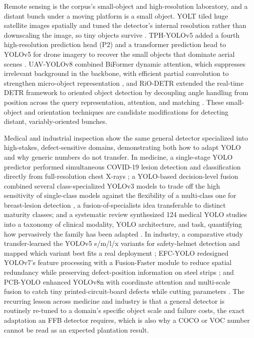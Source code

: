Remote sensing is the corpus's small-object and high-resolution laboratory, and a distant bunch under a moving platform is a small object. YOLT tiled huge satellite images spatially and tuned the detector's internal resolution rather than downscaling the image, so tiny objects survive \cite{vanetten2018yolt}. TPH-YOLOv5 added a fourth high-resolution prediction head (P2) and a transformer prediction head to YOLOv5 for drone imagery to recover the small objects that dominate aerial scenes \cite{zhu2021tphyolov5}. UAV-YOLOv8 combined BiFormer dynamic attention, which suppresses irrelevant background in the backbone, with efficient partial convolution to strengthen micro-object representation \cite{wang2023uavyolo}, and RiO-DETR extended the real-time DETR framework to oriented object detection by decoupling angle handling from position across the query representation, attention, and matching \cite{hu2026riodetr}. These small-object and orientation techniques are candidate modifications for detecting distant, variably-oriented bunches.

Medical and industrial inspection show the same general detector specialized into high-stakes, defect-sensitive domains, demonstrating both how to adapt YOLO and why generic numbers do not transfer. In medicine, a single-stage YOLO predictor performed simultaneous COVID-19 lesion detection and classification directly from full-resolution chest X-rays \cite{alantari2020covid}; a YOLO-based decision-level fusion combined several class-specialized YOLOv3 models to trade off the high sensitivity of single-class models against the flexibility of a multi-class one for breast-lesion detection \cite{baccouche2021breast}, a fusion-of-specialists idea transferable to distinct maturity classes; and a systematic review synthesized 124 medical YOLO studies into a taxonomy of clinical modality, YOLO architecture, and task, quantifying how pervasively the family has been adapted \cite{qureshi2024medyolo}. In industry, a comparative study transfer-learned the YOLOv5 s/m/l/x variants for safety-helmet detection and mapped which variant best fits a real deployment \cite{zhou2021helmet}; EFC-YOLO redesigned YOLOv7's feature processing with a Fusion-Faster module to reduce spatial redundancy while preserving defect-position information on steel strips \cite{yang2023efcyolo}; and PCB-YOLO enhanced YOLOv8n with coordinate attention and multi-scale fusion to catch tiny printed-circuit-board defects while cutting parameters \cite{tang2024pcbyolo}. The recurring lesson across medicine and industry is that a general detector is routinely re-tuned to a domain's specific object scale and failure costs, the exact adaptation an FFB detector requires, which is also why a COCO or VOC number cannot be read as an expected plantation result.

